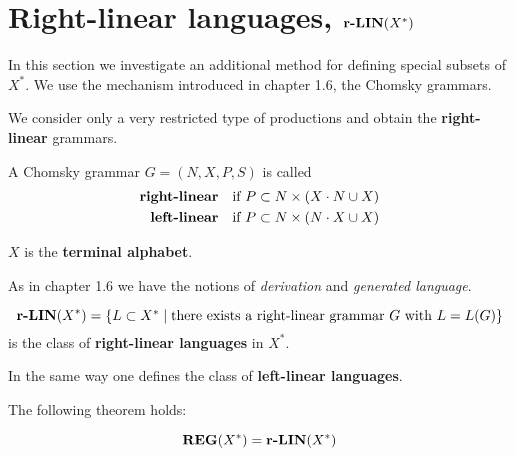 \section{Right-linear languages, $\mbox{{\bf r-LIN}}(X^*)$}

In this section we investigate an additional method for defining special subsets
of $X^*$. We use the mechanism introduced in chapter 1.6, the Chomsky grammars.

We consider only a very restricted type of productions and obtain the {\bf
right-linear} grammars.

\begin{definition}
A Chomsky grammar $G = (N, X, P, S)$ is called
\begin{eqnarray*}
\mbox{\bf right-linear} & & \mbox{if } P \subset N \times (X \cdot N \cup X) \\
\mbox{\bf left-linear}  & & \mbox{if } P \subset N \times (N \cdot X \cup X)
\end{eqnarray*}
\end{definition}

$X$ is the {\bf terminal alphabet}.

As in chapter 1.6 we have the notions of {\em derivation} and {\em generated
language}.

\begin{definition}
\[ \mbox{{\bf r-LIN}}(X^*) = \mbox{$\{L \subset X^* \mid \mbox{there exists a right-linear
grammar $G$ with } L = L(G)\}$} \]
is the class of {\bf right-linear languages} in $X^*$.
\end{definition}

In the same way one defines the class of {\bf left-linear languages}.

The following theorem holds:

\begin{theorem}
\[ \mbox{{\bf REG}}(X^*) = \mbox{{\bf r-LIN}}(X^*) \]
\end{theorem}

